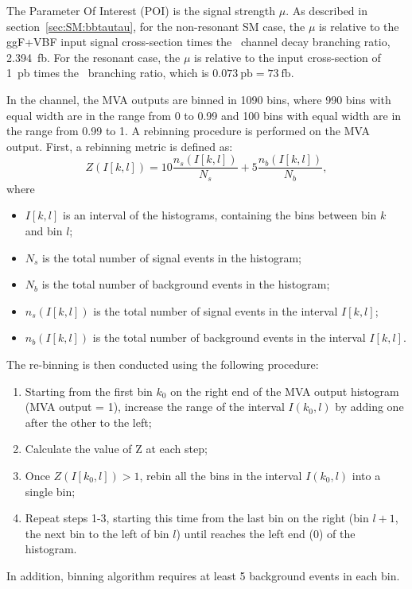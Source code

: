 The Parameter Of Interest (POI) is the signal strength $\mu$.  
As described in section~\ref{sec:SM:bbtautau},
for the non-resonant SM case, the $\mu$ is relative to the ggF+VBF input signal cross-section times 
the \bbtautau\ channel decay branching ratio, 
2.394~fb. 
For the resonant case,  the $\mu$ is relative to the input cross-section of 1~pb times the \bbtautau\ 
branching ratio, which is $0.073~\text{pb} = 73~\text{fb} $.

In the \lephad channel, the MVA outputs are binned in 1090 bins, where 990 bins with equal width are in the range from 0 to 0.99 
and 100 bins with equal width are in the range from 0.99 to 1.
A rebinning procedure is performed on the MVA output. 
First, a rebinning metric is defined as:
\begin{equation}
Z(I[k,l]) = 10 \frac{n_{s}(I[k,l])}{N_{s}} + 5 \frac{n_{b}(I[k,l])}{N_{b}},
\end{equation}
where
\begin{itemize}
\item $I[k,l]$ is an interval of the histograms, containing the bins between bin $k$ and bin $l$;
\item $N_{s}$ is the total number of signal events in the histogram;
\item $N_{b}$ is the total number of background events in the histogram;
\item $n_{s}(I[k,l])$ is the total number of signal events in the interval $I[k,l]$;
\item $n_{b}(I[k,l])$ is the total number of background events in the interval $I[k,l]$.
\end{itemize}
The re-binning is then conducted using the following procedure:
\begin{enumerate}
\item Starting from the first bin $k_0$ on the right end of the MVA output histogram (MVA output = 1), 
increase the range of the interval $I(k_0, l)$ 
by adding one after the other to the left;
\item Calculate the value of Z at each step;
\item Once $Z(I[k_{0}, l]) > 1$, rebin all the bins in the interval $I(k_{0}, l)$ into a single bin;
\item Repeat steps 1-3, starting this time from the last bin on the right (bin $l+1$, the next bin to the left of bin $l$)
until reaches the left end (0) of the histogram.
\end{enumerate}
In addition, binning algorithm requires at least 5 background events in each bin. 

